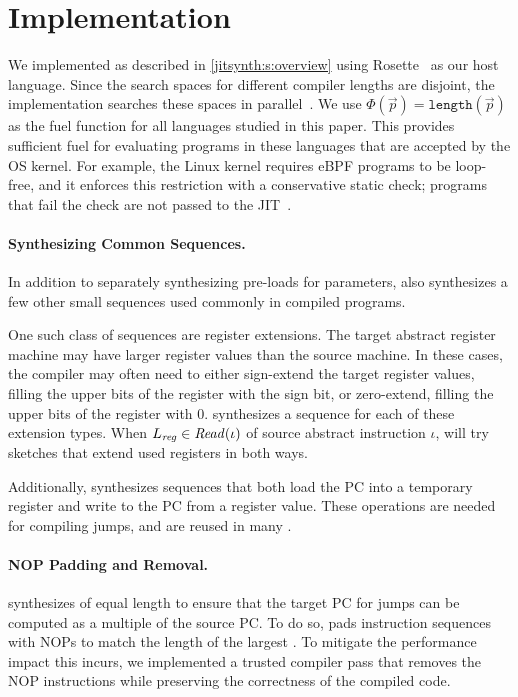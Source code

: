 \section{Implementation}\label{jitsynth:s:impl}
We implemented \jitsynth as described in \autoref{jitsynth:s:overview} using
Rosette~\cite{torlak:rosette} as our host language.
Since the search spaces for different compiler lengths are disjoint,
the \jitsynth implementation searches these spaces in parallel~\cite{bornholt:synapse}.
%
%
We use $\Phi(\vec{p}) = \texttt{length}(\vec{p})$ as the fuel function for all
languages studied in this paper. This provides sufficient fuel for evaluating
programs in these languages that are accepted by the OS kernel. For example, the
Linux kernel requires eBPF programs to be loop-free, and it enforces this
restriction with a conservative static check; programs that fail the check are
not passed to the JIT~\cite{gershuni:crab-ebpf}.

\paragraph{Synthesizing Common Sequences.}
In addition to separately synthesizing pre-loads for parameters,
\jitsynth also synthesizes a few other small sequences used commonly in compiled programs.

One such class of sequences are register extensions.
The target abstract register machine may have larger register values than the source machine.
In these cases, the compiler may often need to either sign-extend the target register values,
filling the upper bits of the register with the sign bit,
or zero-extend, filling the upper bits of the register with 0.
\jitsynth synthesizes a sequence for each of these extension types.
When $L_\mathit{reg}\in\mathit{Read}(\iota)$ of source abstract instruction $\iota$,
\jitsynth will try sketches that extend used registers in both ways.

Additionally, \jitsynth synthesizes sequences
that both load the PC into a temporary register
and write to the PC from a register value.
These operations are needed for compiling jumps,
and are reused in many \minicompilers.

\paragraph{NOP Padding and Removal.}
\jitsynth synthesizes \minicompilers of equal length to ensure that
the target PC for jumps can be computed as a multiple of the source PC.
%
To do so, \jitsynth pads instruction sequences with NOPs to match the length
of the largest \minicompiler.
%
To mitigate the performance impact this incurs, we implemented a trusted compiler
pass that removes the NOP instructions while preserving the correctness of
the compiled code.
\tighten

